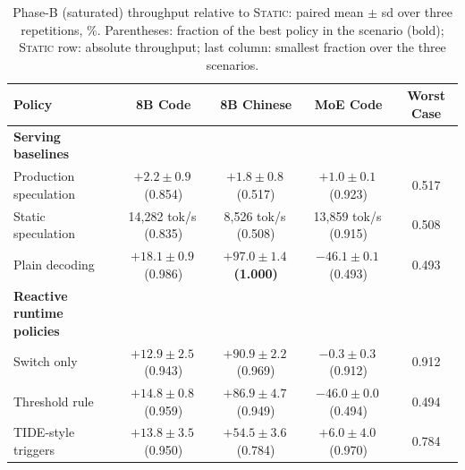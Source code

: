 \documentclass{article}
\newcommand{\pol}[1]{\textsc{#1}}
\begin{document}
\begin{table}[t]
\caption{Phase-B (saturated) throughput relative to \pol{Static}: paired mean $\pm$ sd over three repetitions, \%. Parentheses: fraction of the best policy in the scenario (bold); \pol{Static} row: absolute throughput; last column: smallest fraction over the three scenarios.}
\label{tab:main}
\centering\small

\renewcommand{\arraystretch}{1.15}
\setlength{\tabcolsep}{4pt}

\begin{tabular}{@{}lcccc@{}}
\toprule
\textbf{Policy} &
\textbf{8B Code} &
\textbf{8B Chinese} &
\textbf{MoE Code} &
\textbf{Worst Case} \\
\midrule

\rowcolor{tabGroup}
\textbf{\footnotesize Serving baselines}
& & & & \\

Production speculation
& $+2.2\pm0.9$\,{\scriptsize(0.854)}
& $+1.8\pm0.8$\,{\scriptsize(0.517)}
& $+1.0\pm0.1$\,{\scriptsize(0.923)}
& 0.517 \\

Static speculation
& 14{,}282 tok/s\,{\scriptsize(0.835)}
& 8{,}526 tok/s\,{\scriptsize(0.508)}
& 13{,}859 tok/s\,{\scriptsize(0.915)}
& 0.508 \\

Plain decoding
& $+18.1\pm0.9$\,{\scriptsize(0.986)}
& \cellcolor{tabBest}
  $\boldsymbol{+97.0\pm1.4}$\,{\scriptsize\bfseries(1.000)}
& $-46.1\pm0.1$\,{\scriptsize(0.493)}
& 0.493 \\

\addlinespace[3pt]

\rowcolor{tabGroup}
\textbf{\footnotesize Reactive runtime policies}
& & & & \\

Switch only
& $+12.9\pm2.5$\,{\scriptsize(0.943)}
& $+90.9\pm2.2$\,{\scriptsize(0.969)}
& $-0.3\pm0.3$\,{\scriptsize(0.912)}
& 0.912 \\

Threshold rule
& $+14.8\pm0.8$\,{\scriptsize(0.959)}
& $+86.9\pm4.7$\,{\scriptsize(0.949)}
& $-46.0\pm0.0$\,{\scriptsize(0.494)}
& 0.494 \\

TIDE-style triggers
& $+13.8\pm3.5$\,{\scriptsize(0.950)}
& $+54.5\pm3.6$\,{\scriptsize(0.784)}
& $+6.0\pm4.0$\,{\scriptsize(0.970)}
& 0.784 \\


\end{tabular}
\end{table}
\end{document}
